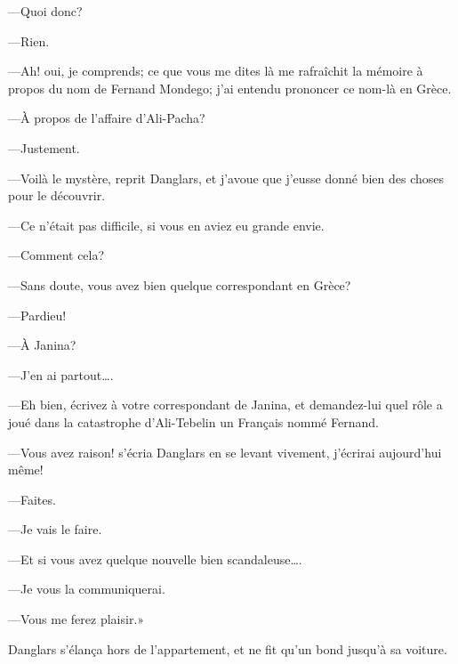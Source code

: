 —Quoi donc? 

—Rien. 

—Ah! oui, je comprends; ce que vous me dites là me rafraîchit la mémoire à propos du nom de Fernand Mondego; j'ai entendu prononcer ce nom-là en Grèce. 

—À propos de l'affaire d'Ali-Pacha? 

—Justement. 

—Voilà le mystère, reprit Danglars, et j'avoue que j'eusse donné bien des choses pour le découvrir. 

—Ce n'était pas difficile, si vous en aviez eu grande envie. 

—Comment cela? 

—Sans doute, vous avez bien quelque correspondant en Grèce? 

—Pardieu! 

—À Janina? 

—J'en ai partout\dots. 

—Eh bien, écrivez à votre correspondant de Janina, et demandez-lui quel rôle a joué dans la catastrophe d'Ali-Tebelin un Français nommé Fernand. 

—Vous avez raison! s'écria Danglars en se levant vivement, j'écrirai aujourd'hui même! 

—Faites. 

—Je vais le faire.  

—Et si vous avez quelque nouvelle bien scandaleuse\dots. 

—Je vous la communiquerai. 

—Vous me ferez plaisir.» 

Danglars s'élança hors de l'appartement, et ne fit qu'un bond jusqu'à sa voiture. 